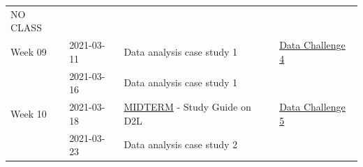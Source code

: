 \documentclass[
]{book}
\begin{document}
\begin{longtable}[]{@{}llll@{}}
\begin{minipage}[t]{0.22\columnwidth}
NO CLASS\strut
\end{minipage}\tabularnewline
\begin{minipage}[t]{0.22\columnwidth}\raggedright
Week 09\strut
\end{minipage} & \begin{minipage}[t]{0.22\columnwidth}\raggedright
2021-03-11\strut
\end{minipage} & \begin{minipage}[t]{0.22\columnwidth}\raggedright
Data analysis case study 1\strut
\end{minipage} & \begin{minipage}[t]{0.22\columnwidth}\raggedright
\href{}{Data Challenge 4}\strut
\end{minipage}\tabularnewline
\begin{minipage}[t]{0.22\columnwidth}\raggedright
\strut
\end{minipage} & \begin{minipage}[t]{0.22\columnwidth}\raggedright
2021-03-16\strut
\end{minipage} & \begin{minipage}[t]{0.22\columnwidth}\raggedright
Data analysis case study 1\strut
\end{minipage} & \begin{minipage}[t]{0.22\columnwidth}\raggedright
\strut
\end{minipage}\tabularnewline
\begin{minipage}[t]{0.22\columnwidth}\raggedright
Week 10\strut
\end{minipage} & \begin{minipage}[t]{0.22\columnwidth}\raggedright
2021-03-18\strut
\end{minipage} & \begin{minipage}[t]{0.22\columnwidth}\raggedright
\href{}{MIDTERM} - Study Guide on D2L\strut
\end{minipage} & \begin{minipage}[t]{0.22\columnwidth}\raggedright
\href{}{Data Challenge 5}\strut
\end{minipage}\tabularnewline
\begin{minipage}[t]{0.22\columnwidth}\raggedright
\strut
\end{minipage} & \begin{minipage}[t]{0.22\columnwidth}\raggedright
2021-03-23\strut
\end{minipage} & \begin{minipage}[t]{0.22\columnwidth}\raggedright
Data analysis case study 2\strut
\end{minipage} & \begin{minipage}[t]{0.22\columnwidth}\raggedright

\end{minipage}
\end{longtable}
\end{document}
